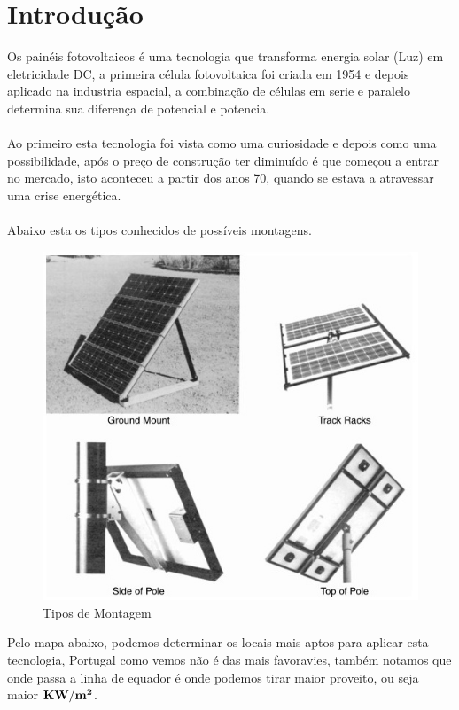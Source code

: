 \section{Introdução}
\qquad Os painéis fotovoltaicos é uma tecnologia que transforma energia solar (Luz) em eletricidade DC, a primeira célula fotovoltaica foi criada em 1954 e depois aplicado na industria espacial, a combinação de células em serie e paralelo determina sua diferença de potencial e potencia.\cite{article_1}\\
\\
Ao primeiro esta tecnologia foi vista como uma curiosidade e depois como uma possibilidade, após o preço de construção ter diminuído é que começou a entrar no mercado, isto aconteceu a partir dos anos 70, quando se estava a atravessar uma crise energética.\cite{article_1}\\
\\
Abaixo esta os tipos conhecidos de possíveis montagens.\\
\begin{figure}[H]
\centering
\includegraphics[scale=0.6]{./image/Mount_Method.jpg}
\caption{Tipos de Montagem \cite{book_2}}
\end{figure}
Pelo mapa abaixo, podemos determinar os locais mais aptos para aplicar esta tecnologia, Portugal como vemos não é das mais favoravies, também notamos que onde passa a linha de equador é onde podemos tirar maior proveito, ou seja maior {$\bf KW/m^2$}.
